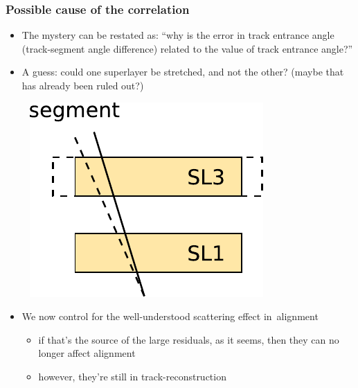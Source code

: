 \documentclass[compress]{beamer}
\begin{document}
\begin{frame}
\frametitle{Possible cause of the correlation}

\begin{itemize}
\item The mystery can be restated as: ``why is the error in track entrance
  angle (track-segment angle difference) related to the value of track
  entrance angle?''
\item A guess: could one superlayer be stretched, and not the other? (maybe that has already been ruled out?)

\mbox{ } \hfill \includegraphics[width=0.3\linewidth]{pure_speculation.pdf} \hfill \mbox{ }

\item We now control for the well-understood scattering effect \mbox{in alignment\hspace{-1 cm}}
\begin{itemize}
\item if that's the source of the large residuals, as it seems, then they can no longer affect alignment
\item however, they're still in track-reconstruction
\end{itemize}
\end{itemize}
\end{frame}
\end{document}
